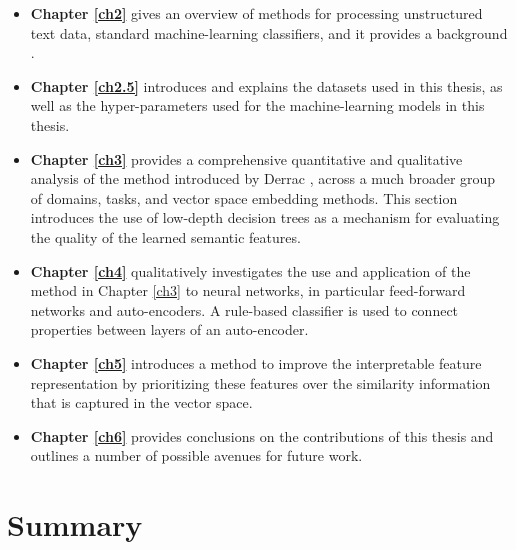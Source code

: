 \begin{itemize}
	\item \textbf{Chapter \ref{ch2}} gives an overview of methods for processing unstructured text data, standard machine-learning classifiers, and it provides a background .
	\item \textbf{Chapter \ref{ch2.5}} introduces and explains the datasets used in this thesis, as well as  the hyper-parameters  used for the machine-learning models in this thesis.
	\item \textbf{Chapter \ref{ch3}} provides a comprehensive quantitative and qualitative analysis of the method introduced by Derrac \cite{Derrac2015}, across a much broader group of domains, tasks, and vector space embedding methods. This section introduces the use of low-depth decision trees as a mechanism for evaluating the quality of the learned semantic features.  
	\item \textbf{Chapter \ref{ch4}} qualitatively investigates the use and application of the method in Chapter \ref{ch3} to neural networks, in particular feed-forward networks and auto-encoders. A rule-based classifier is used to connect properties between layers of an auto-encoder.
	\item \textbf{Chapter \ref{ch5}} introduces a  method to improve the interpretable feature representation by prioritizing these features over the similarity information that is captured in the vector space.
	\item \textbf{Chapter \ref{ch6}} provides conclusions on the contributions of this thesis and outlines a number of possible avenues for future work.
\end{itemize}


\section{Summary}

